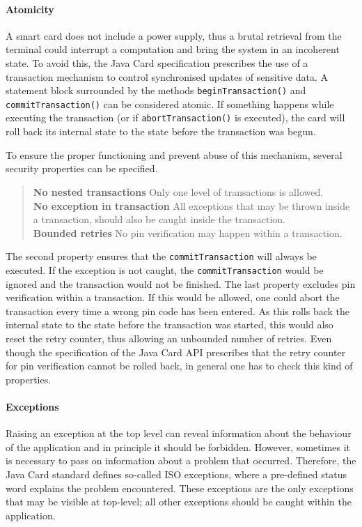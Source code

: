 \paragraph {Atomicity}

A smart card does not include a power supply, thus a brutal retrieval
from the terminal could interrupt a computation and bring the system in
an incoherent state. To avoid this, the Java Card
specification prescribes the use of a transaction mechanism to
control synchronised updates of sensitive data. A 
statement block surrounded by the methods \texttt{beginTransaction()} and
\texttt{commitTransaction()} can be considered atomic.
If something happens while executing the transaction (or if
\texttt{abortTransaction()} is executed), the card will
roll back its internal state to the state before the transaction was
begun.

To ensure the proper functioning and prevent abuse of this mechanism,
several security properties can be specified.

\begin{quote}
\textbf{No nested transactions} Only one level of transactions
is allowed.\smallskip\\
\textbf{No exception in transaction} All exceptions that may be thrown
inside a transaction, should also be caught inside the
transaction.\smallskip\\
\textbf{Bounded retries}
No pin verification may happen within a transaction.
\end{quote} 
The second property ensures that the \texttt{commitTransaction} will
always be executed. If the exception is not caught, the
\texttt{commitTransaction} would be ignored and the transaction would
not be finished. The last property excludes pin verification within a
transaction. If this would be allowed, one could abort the transaction
every time a wrong pin code has been entered. As this rolls
back the internal state to the state before the transaction was
started, this would also reset the retry counter, thus allowing an
unbounded number of retries. Even though the specification of the Java
Card API prescribes that the retry counter for pin verification cannot
be rolled back, in general one has to check this kind of properties.

\paragraph{Exceptions}

Raising an exception at the top level can reveal
information about the behaviour of the application and in principle it
should be forbidden. However, sometimes it is necessary to pass on
information about a problem that occurred. Therefore, the Java
Card standard defines so-called ISO exceptions, where a pre-defined
status word explains the problem encountered. These exceptions are the
only exceptions that may be visible at top-level; all other exceptions
should be caught within the application.

